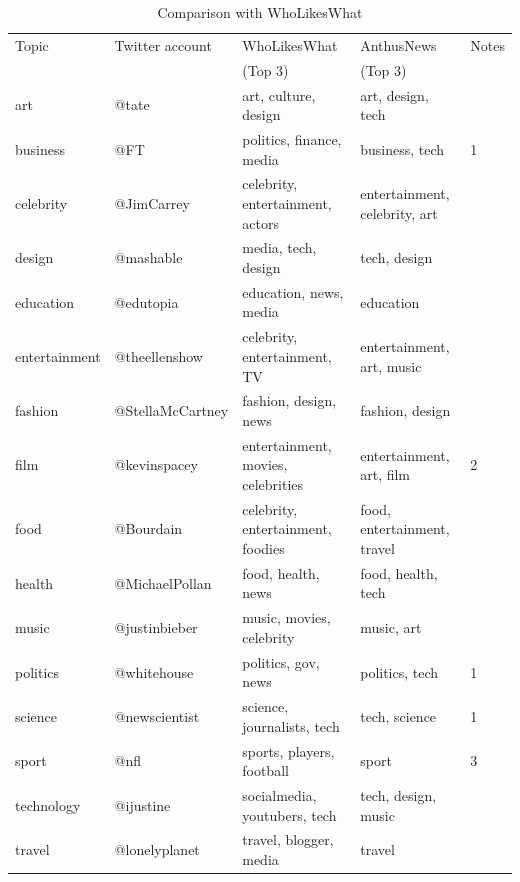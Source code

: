 \documentclass[11pt]{article}
\begin{document}
\begin{table}[]
\centering

\begin{tabu} to 
\toprule
Topic & Twitter account  & WhoLikesWhat & AnthusNews	& Notes \\ 
 	 & 			      & (Top 3) 		& (Top 3) 		& \\

\midrule
art           & @tate            & art, culture, design              & art, design, tech           &       \\
business      & @FT              & politics, finance, media            & business, tech               & 1     \\
celebrity     & @JimCarrey       & celebrity, entertainment, actors    & entertainment, celebrity, art &       \\
design        & @mashable        & media, tech, design                 & tech, design                 &       \\
education     & @edutopia        & education, news, media              & education                   &       \\
entertainment & @theellenshow    & celebrity, entertainment, TV        & entertainment, art, music     &       \\
fashion       & @StellaMcCartney & fashion, design, news               & fashion, design              &       \\
film          & @kevinspacey     & entertainment, movies, celebrities  & entertainment, art, film      & 2     \\
food          & @Bourdain        & celebrity, entertainment, foodies & food, entertainment, travel &       \\
health        & @MichaelPollan   & food, health, news                  & food, health, tech            &       \\
music         & @justinbieber    & music, movies, celebrity            & music, art                  &       \\
politics      & @whitehouse      & politics, gov, news                 & politics, tech               & 1     \\
science       & @newscientist    & science, journalists, tech          & tech, science               & 1     \\
sport         & @nfl             & sports, players, football           & sport                       & 3     \\
technology    & @ijustine        & socialmedia, youtubers, tech        & tech, design, music           &       \\
travel        & @lonelyplanet    & travel, blogger, media              & travel                      &       \\ 
\bottomrule
\end{tabu}

\caption{Comparison with WhoLikesWhat}
\label{wholikeswhatcomparison}
\end{table}
\end{document}
